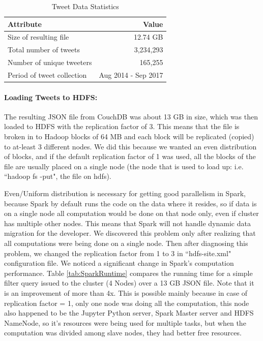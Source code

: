 \documentclass[12pt]{report}
\theoremstyle{named}
\begin{document}
\begin{table}[ht]
\centering
\begin{tabular}{@{}lr@{}}
\toprule
\textbf{Attribute}          & \textbf{Value}      \\ \midrule
Size of resulting file     & 12.74 GB            \\
Total number of tweets     & 3,234,293             \\
Number of unique tweeters  & 165,255              \\
Period of tweet collection & Aug 2014 - Sep 2017 \\ \bottomrule
\end{tabular}
\caption{Tweet Data Statistics}
\label{tab:tweetdata}
\end{table}
\paragraph{Loading Tweets to HDFS:\\}
The resulting JSON file from CouchDB was about 13 GB in size, which was then loaded to HDFS with the replication factor of 3. This means that the file is broken in to Hadoop blocks of 64 MB and each block will be replicated (copied) to at-least 3 different nodes. We did this because we wanted an even distribution of blocks, and if the default replication factor of 1 was used, all the blocks of the file are usually placed on a single node (the node that is used to load up: i.e. ``hadoop fs -put", the file on hdfs).

Even/Uniform distribution is necessary for getting good parallelism in Spark, because Spark by default runs the code on the data where it resides, so if data is on a single node all computation would be done on that node only, even if cluster has multiple other nodes. This means that Spark will not handle dynamic data migration for the developer. We discovered this problem only after realizing that all computations were being done on a single node. Then after diagnosing this problem, we changed the replication factor from 1 to 3 in ``hdfs-site.xml" configuration file. We noticed a significant change in Spark's computation performance. Table \ref{tab:SparkRuntime} compares the running time for a simple filter query issued to the cluster (4 Nodes) over a 13 GB JSON file. Note that it is an improvement of more than 4x. This is possible mainly because in case of replication factor = 1, only one node was doing all the computation, this node also happened to be the Jupyter Python server, Spark Master server and HDFS NameNode, so it's resources were being used for multiple tasks, but when the computation was divided among slave nodes, they had better free resources.
\end{document}
